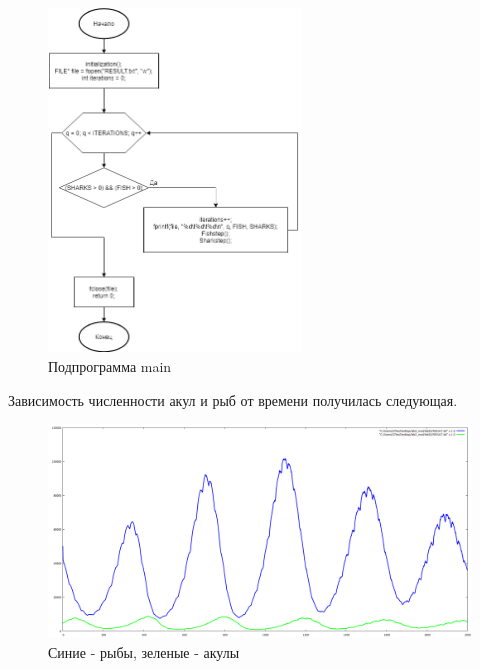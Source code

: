 \documentclass[14pt]{extarticle}
\begin{document}
\newpage
\begin{figure}[!h]
  \centering
  \includegraphics[width=0.6\textwidth]{main.png}
  \caption{Подпрограмма main\label{second}}
\end{figure}

\newpage
Зависимость численности акул и рыб от времени получилась следующая.
\begin{figure}[!h]
  \centering
  \includegraphics[width=1\textwidth]{RESULT.png}
  \caption{Синие - рыбы, зеленые - акулы\label{second}}
\end{figure}



\end{document}
